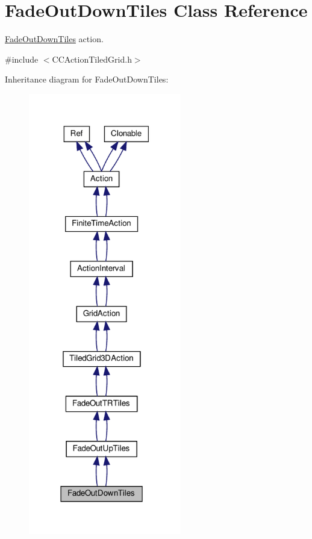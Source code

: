 \hypertarget{classFadeOutDownTiles}{}\section{Fade\+Out\+Down\+Tiles Class Reference}
\label{classFadeOutDownTiles}


\hyperlink{classFadeOutDownTiles}{Fade\+Out\+Down\+Tiles} action.  




{\ttfamily \#include $<$C\+C\+Action\+Tiled\+Grid.\+h$>$}



Inheritance diagram for Fade\+Out\+Down\+Tiles\+:
\nopagebreak
\begin{figure}[H]
\begin{center}
\leavevmode
\includegraphics[width=189pt]{classFadeOutDownTiles__inherit__graph}
\end{center}
\end{figure}


